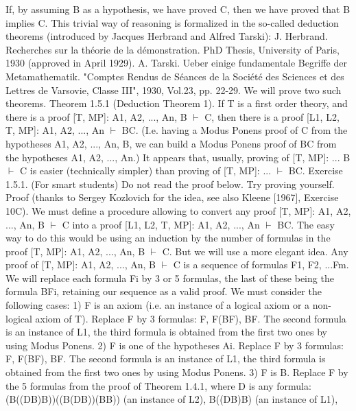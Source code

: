 If, by assuming B as a hypothesis, we have proved C, then we have proved that B implies C. This trivial
way of reasoning is formalized in the so-called deduction theorems (introduced by Jacques Herbrand
and Alfred Tarski):
J. Herbrand. Recherches sur la théorie de la démonstration. PhD Thesis, University of Paris, 1930 (approved in April 1929).
A. Tarski. Ueber einige fundamentale Begriffe der Metamathematik. "Comptes Rendus de Séances de la Société des Sciences
et des Lettres de Varsovie, Classe III", 1930, Vol.23, pp. 22-29.
We will prove two such theorems.
Theorem 1.5.1 (Deduction Theorem 1). If T is a first order theory, and there is a proof [T, MP]: A1,
A2, ..., An, B \(\vdash\) C, then there is a proof [L1, L2, T, MP]: A1, A2, ..., An \(\vdash\) B\IMPLIES C. (I.e. having a Modus
Ponens proof of C from the hypotheses A1, A2, ..., An, B, we can build a Modus Ponens proof of B\IMPLIES C
from the hypotheses A1, A2, ..., An.)
It appears that, usually, proving of [T, MP]: ... B \(\vdash\) C is easier (technically simpler) than proving of [T,
MP]: ... \(\vdash\) B\IMPLIES C.
Exercise 1.5.1. (For smart students) Do not read the proof below. Try proving yourself.
Proof (thanks to Sergey Kozlovich for the idea, see also Kleene [1967], Exercise 10C). We must define a
procedure allowing to convert any proof [T, MP]: A1, A2, ..., An, B \(\vdash\) C into a proof [L1, L2, T, MP]: A1,
A2, ..., An \(\vdash\) B\IMPLIES C.
The easy way to do this would be using an induction by the number of formulas in the proof [T, MP]: A1,
A2, ..., An, B \(\vdash\) C. But we will use a more elegant idea. Any proof of [T, MP]: A1, A2, ..., An, B \(\vdash\) C is a
sequence of formulas F1, F2, ...Fm. We will replace each formula Fi by 3 or 5 formulas, the last of these
being the formula B\IMPLIES Fi, retaining our sequence as a valid proof.
We must consider the following cases:
1) F is an axiom (i.e. an instance of a logical axiom or a non-logical axiom of T). Replace F by 3
formulas: F, F\IMPLIES (B\IMPLIES F), B\IMPLIES F. The second formula is an instance of L1, the third formula is obtained
from the first two ones by using Modus Ponens.
2) F is one of the hypotheses Ai. Replace F by 3 formulas: F, F\IMPLIES (B\IMPLIES F), B\IMPLIES F. The second formula is an
instance of L1, the third formula is obtained from the first two ones by using Modus Ponens.
3) F is B. Replace F by the 5 formulas from the proof of Theorem 1.4.1, where D is any formula:
(B\IMPLIES ((D\IMPLIES B)\IMPLIES B))\IMPLIES ((B\IMPLIES (D\IMPLIES B))\IMPLIES (B\IMPLIES B)) (an instance of L2),
B\IMPLIES ((D\IMPLIES B)\IMPLIES B) (an instance of L1),
